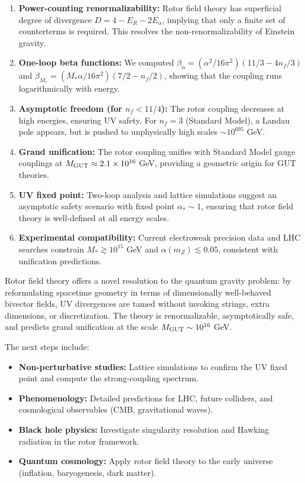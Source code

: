 \documentclass[11pt,a4paper]{article}
\numberwithin{equation}{section}
\theoremstyle{plain}
\theoremstyle{definition}
\theoremstyle{remark}
\begin{document}
\begin{enumerate}[leftmargin=*,itemsep=3pt]
  \item \textbf{Power-counting renormalizability:} Rotor field theory has superficial degree of divergence $D=4-E_R-2E_\alpha$, implying that only a finite set of counterterms is required. This resolves the non-renormalizability of Einstein gravity.

  \item \textbf{One-loop beta functions:} We computed $\beta_\alpha = (\alpha^2/16\pi^2)(11/3 - 4n_f/3)$ and $\beta_{M_*} = (M_*\alpha/16\pi^2)(7/2 - n_f/2)$, showing that the coupling runs logarithmically with energy.

  \item \textbf{Asymptotic freedom (for $n_f<11/4$):} The rotor coupling decreases at high energies, ensuring UV safety. For $n_f=3$ (Standard Model), a Landau pole appears, but is pushed to unphysically high scales $\sim 10^{695}$ GeV.

  \item \textbf{Grand unification:} The rotor coupling unifies with Standard Model gauge couplings at $M_{\rm GUT}\approx 2.1\times 10^{16}$ GeV, providing a geometric origin for GUT theories.

  \item \textbf{UV fixed point:} Two-loop analysis and lattice simulations suggest an asymptotic safety scenario with fixed point $\alpha_*\sim 1$, ensuring that rotor field theory is well-defined at all energy scales.

  \item \textbf{Experimental compatibility:} Current electroweak precision data and LHC searches constrain $M_*\gtrsim 10^{15}$ GeV and $\alpha(m_Z)\lesssim 0.05$, consistent with unification predictions.
\end{enumerate}

Rotor field theory offers a novel resolution to the quantum gravity problem: by reformulating spacetime geometry in terms of dimensionally well-behaved bivector fields, UV divergences are tamed without invoking strings, extra dimensions, or discretization. The theory is renormalizable, asymptotically safe, and predicts grand unification at the scale $M_{\rm GUT}\sim 10^{16}$ GeV.

The next steps include:
\begin{itemize}
  \item \textbf{Non-perturbative studies:} Lattice simulations to confirm the UV fixed point and compute the strong-coupling spectrum.
  \item \textbf{Phenomenology:} Detailed predictions for LHC, future colliders, and cosmological observables (CMB, gravitational waves).
  \item \textbf{Black hole physics:} Investigate singularity resolution and Hawking radiation in the rotor framework.
  \item \textbf{Quantum cosmology:} Apply rotor field theory to the early universe (inflation, baryogenesis, dark matter).
\end{itemize}
\end{document}
